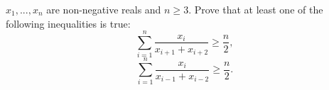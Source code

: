 $x_1,...,x_n$ are non-negative reals and $n \geq 3$. Prove that at least one of the following inequalities is true: \[ \sum_{i=1} ^n \frac{x_i}{x_{i+1}+x_{i+2}} \geq \frac{n}{2},  \] \[ \sum_{i=1} ^n \frac{x_i}{x_{i-1}+x_{i-2}} \geq \frac{n}{2} .  \]